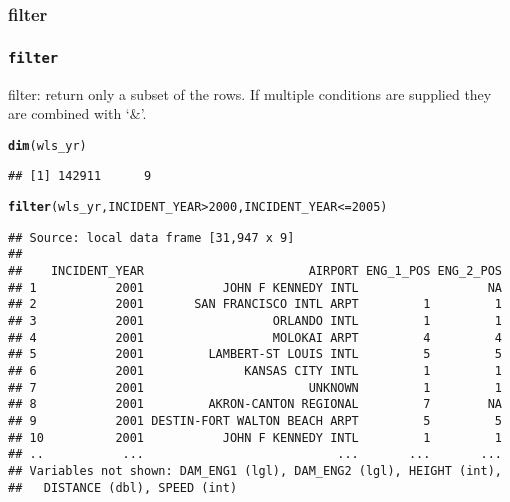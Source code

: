 \documentclass{beamer}\usepackage[]{graphicx}\usepackage[]{color}
\makeatletter
\newcommand{\hlnum}[1]{\textcolor[rgb]{0.686,0.059,0.569}{#1}}%
\newcommand{\hlopt}[1]{\textcolor[rgb]{0,0,0}{#1}}%
\newcommand{\hlstd}[1]{\textcolor[rgb]{0.345,0.345,0.345}{#1}}%
\newcommand{\hlkwd}[1]{\textcolor[rgb]{0.737,0.353,0.396}{\textbf{#1}}}%
\newenvironment{kframe}{%
 \def\at@end@of@kframe{}%
 \ifinner\ifhmode%
  \def\at@end@of@kframe{\end{minipage}}%
  \begin{minipage}{\columnwidth}%
 \fi\fi%
 \def\FrameCommand##1{\hskip\@totalleftmargin \hskip-\fboxsep
 \colorbox{shadecolor}{##1}\hskip-\fboxsep
     \hskip-\linewidth \hskip-\@totalleftmargin \hskip\columnwidth}%
 \MakeFramed {\advance\hsize-\width
   \@totalleftmargin\z@ \linewidth\hsize
   \@setminipage}}%
 {\par\unskip\endMakeFramed%
 \at@end@of@kframe}
\newenvironment{knitrout}{}{} %
\makeatother
\begin{document}
\subsubsection{filter}%
\begin{frame}[fragile]
  \frametitle{{\tt filter}}
filter: return only a subset of the rows. If multiple
conditions are supplied they are combined with ‘\&’.
\begin{knitrout}\footnotesize
{}\color{fgcolor}\begin{kframe}
\begin{alltt}
\hlkwd{dim}\hlstd{(wls_yr)}
\end{alltt}
\begin{verbatim}
## [1] 142911      9
\end{verbatim}
\begin{alltt}
\hlkwd{filter}\hlstd{(wls_yr, INCIDENT_YEAR} \hlopt{>} \hlnum{2000}\hlstd{, INCIDENT_YEAR} \hlopt{<=} \hlnum{2005}\hlstd{)}
\end{alltt}
\begin{verbatim}
## Source: local data frame [31,947 x 9]
## 
##    INCIDENT_YEAR                       AIRPORT ENG_1_POS ENG_2_POS
## 1           2001           JOHN F KENNEDY INTL                  NA
## 2           2001       SAN FRANCISCO INTL ARPT         1         1
## 3           2001                  ORLANDO INTL         1         1
## 4           2001                  MOLOKAI ARPT         4         4
## 5           2001         LAMBERT-ST LOUIS INTL         5         5
## 6           2001              KANSAS CITY INTL         1         1
## 7           2001                       UNKNOWN         1         1
## 8           2001         AKRON-CANTON REGIONAL         7        NA
## 9           2001 DESTIN-FORT WALTON BEACH ARPT         5         5
## 10          2001           JOHN F KENNEDY INTL         1         1
## ..           ...                           ...       ...       ...
## Variables not shown: DAM_ENG1 (lgl), DAM_ENG2 (lgl), HEIGHT (int),
##   DISTANCE (dbl), SPEED (int)
\end{verbatim}
\end{kframe}
\end{knitrout}
\end{frame} 
\end{document}
